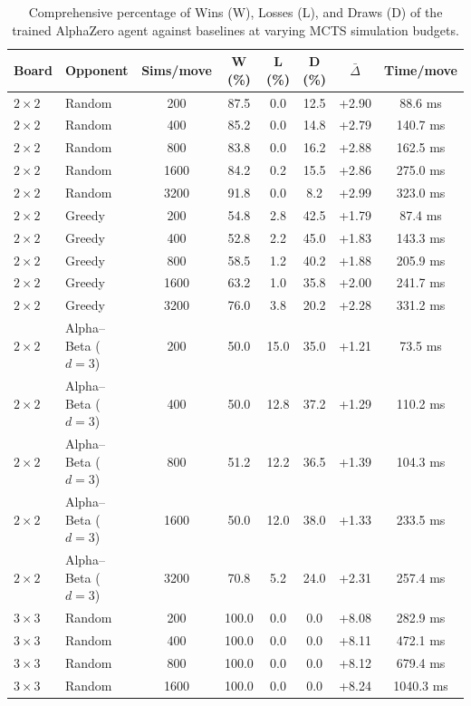\documentclass[11pt]{article}
\begin{document}
\begin{table}[H]
\centering
\caption{Comprehensive percentage of Wins (W), Losses (L), and Draws (D) of the trained AlphaZero agent against baselines at varying MCTS simulation budgets.}
\label{tab:winrates_sims}
\begin{tabular}{llcccccc}
\toprule
Board & Opponent & Sims/move & W (\%) & L (\%) & D (\%) & $\bar{\Delta}$ & Time/move \\
\midrule
$2{\times}2$ & Random & 200  & 87.5 & 0.0 & 12.5 & +2.90 & 88.6 ms \\
$2{\times}2$ & Random & 400  & 85.2 & 0.0 & 14.8 & +2.79 & 140.7 ms \\
$2{\times}2$ & Random & 800  & 83.8 & 0.0 & 16.2 & +2.88 & 162.5 ms \\
$2{\times}2$ & Random & 1600 & 84.2 & 0.2 & 15.5 & +2.86 & 275.0 ms \\
$2{\times}2$ & Random & 3200 & 91.8 & 0.0 & 8.2 & +2.99 & 323.0 ms \\
\midrule
$2{\times}2$ & Greedy & 200  & 54.8 & 2.8 & 42.5 & +1.79 & 87.4 ms \\
$2{\times}2$ & Greedy & 400  & 52.8 & 2.2 & 45.0 & +1.83 & 143.3 ms \\
$2{\times}2$ & Greedy & 800  & 58.5 & 1.2 & 40.2 & +1.88 & 205.9 ms \\
$2{\times}2$ & Greedy & 1600 & 63.2 & 1.0 & 35.8 & +2.00 & 241.7 ms \\
$2{\times}2$ & Greedy & 3200 & 76.0 & 3.8 & 20.2 & +2.28 & 331.2 ms \\
\midrule
$2{\times}2$ & Alpha--Beta ($d{=}3$) & 200  & 50.0 & 15.0 & 35.0 & +1.21 & 73.5 ms \\
$2{\times}2$ & Alpha--Beta ($d{=}3$) & 400  & 50.0 & 12.8 & 37.2 & +1.29 & 110.2 ms \\
$2{\times}2$ & Alpha--Beta ($d{=}3$) & 800  & 51.2 & 12.2 & 36.5 & +1.39 & 104.3 ms \\
$2{\times}2$ & Alpha--Beta ($d{=}3$) & 1600 & 50.0 & 12.0 & 38.0 & +1.33 & 233.5 ms \\
$2{\times}2$ & Alpha--Beta ($d{=}3$) & 3200 & 70.8 & 5.2 & 24.0 & +2.31 & 257.4 ms \\
\midrule
$3{\times}3$ & Random & 200  & 100.0 & 0.0 & 0.0 & +8.08 & 282.9 ms \\
$3{\times}3$ & Random & 400  & 100.0 & 0.0 & 0.0 & +8.11 & 472.1 ms \\
$3{\times}3$ & Random & 800  & 100.0 & 0.0 & 0.0 & +8.12 & 679.4 ms \\
$3{\times}3$ & Random & 1600 & 100.0 & 0.0 & 0.0 & +8.24 & 1040.3 ms \\

\end{tabular}
\end{table}
\end{document}
